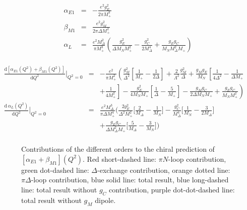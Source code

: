 \documentclass[11pt,preprint,tightenlines,
showpacs,preprintnumbers,amsmath,amssymb,superscriptaddress,a4paper,nofootinbib]{revtex4-1}
\def\bea{\begin{eqnarray}}
\def\eea{\end{eqnarray}}
\def\eqlab#1{\label{eq:#1}}
\def\al{\alpha}
\def\be{\beta}
\def\nn{\nonumber}
\def\dd{\mathrm{d}}
\begin{document}
\bea
\eqlab{alphabetaQ2}
\al_{E1}&=&-\frac{e^2 g_E^2}{2 \pi  M_+^3}\\
\be_{M1}&=&\frac{e^2 g_M^2}{2 \pi  \varDelta  M_+^2}\\
\al_L&=&\frac{e^2 M_\Delta^2}{\pi M_+^3}\left(\frac{ g_E^2}{\varDelta  M_NM_+^2}-\frac{g_C^2}{2 M_\Delta^4}+\frac{ g_E g_C}{M_NM_\Delta^2 M_+}\right)\\
\eea

\bea
\frac{\dd \left[\alpha_{E1}(Q^2)+\beta_{M1}(Q^2)\right]}{\dd Q^2}\Bigg\vert_{Q^2=0}&=&-\frac{e^2}{\pi M_+^2}\left(\frac{g_M^2}{\varDelta^2}\left[\frac{1}{M_+}-\frac{1}{2\varDelta}\right]+\frac{2}{ \Lambda^2 }\frac{g_M^2}{\varDelta}\right.+\frac{g_M g_E}{M_N}\left[\frac{1}{4\varDelta^2}-\frac{1}{\varDelta M_+}\right.\nn\\
&&\left.\left.+\frac{1}{4M_+^2}\right] -\frac{g_E^2}{4M_NM_+}\left[\frac{1}{\varDelta}-\frac{5}{M_+}\right]-\frac{ g_M g_C}{2  \varDelta  M_NM_+}+\frac{g_E g_C}{M_NM_+^2}\right)\qquad\\
\frac{\dd\, \al_L(Q^2)}{\dd Q^2}\Bigg\vert_{Q^2=0}&=&\frac{e^2 M_\Delta^3}{\pi \varDelta M_+^4}\Big(\frac{2g_E^2}{\varDelta^2 M_+^2}\Big[\frac{2}{M_\Delta}-\frac{1}{M_N}\big]-\frac{g_C^2}{ M_\Delta^4}\Big[\frac{1}{M_N}-\frac{3}{2M_\Delta}\Big] \nonumber \\
&&+\frac{g_E g_C}{\varDelta M_\Delta^2 M_+}\Big[\frac{5}{M_\Delta}-\frac{3}{M_N}\Big]\Big)\qquad\\
\eqlab{d2momQ2}
\eea


















\begin{figure}
\begin{center}
\hspace{0.5cm}
\caption{\small{Contributions of the different orders to the chiral prediction of $[\alpha_{E1}+\beta_{M1}](Q^2)$. Red short-dashed line: $\pi N$-loop contribution, green dot-dashed line: $\Delta$-exchange contribution, orange dotted line: $\pi \Delta$-loop contribution, blue solid line: total result, blue long-dashed line: total result without $g_C$ contribution, purple dot-dot-dashed line: total result without $g_M$ dipole.}\label{Fig:alpha+beta-orders}}
\end{center}
\end{figure}
\end{document}
